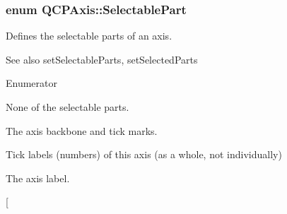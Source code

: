 \subsubsection[{\texorpdfstring{Selectable\+Part}{SelectablePart}}]{\setlength{\rightskip}{0pt plus 5cm}enum {\bf Q\+C\+P\+Axis\+::\+Selectable\+Part}}\hypertarget{class_q_c_p_axis_abee4c7a54c468b1385dfce2c898b115f}{}\label{class_q_c_p_axis_abee4c7a54c468b1385dfce2c898b115f}
Defines the selectable parts of an axis. \begin{DoxySeeAlso}{See also}
set\+Selectable\+Parts, set\+Selected\+Parts 
\end{DoxySeeAlso}
\begin{Desc}
\item[Enumerator]\par
\begin{description}
\item[{\em 
sp\+None\hypertarget{class_q_c_p_axis_abee4c7a54c468b1385dfce2c898b115fac80ec43d6c97386e7c4b728e61fa2385}{}\label{class_q_c_p_axis_abee4c7a54c468b1385dfce2c898b115fac80ec43d6c97386e7c4b728e61fa2385}
}]None of the selectable parts. \item[{\em 
sp\+Axis\hypertarget{class_q_c_p_axis_abee4c7a54c468b1385dfce2c898b115fa13de5b2d81b767cede2182eb7b620865}{}\label{class_q_c_p_axis_abee4c7a54c468b1385dfce2c898b115fa13de5b2d81b767cede2182eb7b620865}
}]The axis backbone and tick marks. \item[{\em 
sp\+Tick\+Labels\hypertarget{class_q_c_p_axis_abee4c7a54c468b1385dfce2c898b115faefdbf8e82b02bca4bb490e737e4a0e25}{}\label{class_q_c_p_axis_abee4c7a54c468b1385dfce2c898b115faefdbf8e82b02bca4bb490e737e4a0e25}
}]Tick labels (numbers) of this axis (as a whole, not individually) \item[{\em 
sp\+Axis\+Label\hypertarget{class_q_c_p_axis_abee4c7a54c468b1385dfce2c898b115fa60e3b20d6f52f565d4b901a5fb1ed8cf}{}\label{class_q_c_p_axis_abee4c7a54c468b1385dfce2c898b115fa60e3b20d6f52f565d4b901a5fb1ed8cf}
}]The axis label. \item[{\em 
}
\end{description}
\end{Desc}
